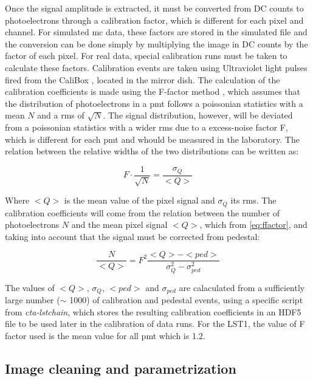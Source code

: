 \documentclass[main.tex]{subfiles}
\begin{document}
Once the signal amplitude is extracted, it must be converted from DC counts to photoelectrons through a calibration factor, which is different for each pixel and channel. For simulated \gls{mc} data, these factors are stored in the simulated file and the conversion can be done simply by multiplying the image in DC counts by the factor of each pixel. For real data, special calibration runs must be taken to calculate these factors. Calibration events are taken using Ultraviolet light pulses fired from the CaliBox \cite{2015CaliBox}, \cite{2019CaliBox} located in the mirror dish. The calculation of the calibration coefficients is made using the F-factor method \cite{1997calibrationPMT}, which assumes that the distribution of photoelectrons in a \gls{pmt} follows a poissonian statistics with a mean $N$ and a \gls{rms} of $\sqrt{N}$. The signal distribution, however, will be deviated from a poissonian statistics with a wider \gls{rms} due to a excess-noise factor F, which is different for each \gls{pmt} and whould be measured in the laboratory. The relation between the relative widths of the two distributions can be written as:

\begin{equation}
  F \cdot \frac{1}{\sqrt{N}} = \frac{\sigma_{Q}}{<Q>}
  \label{eq:ffactor}
\end{equation} 

Where $<Q>$ is the mean value of the pixel signal and $\sigma_{Q}$ its \gls{rms}. The calibration coefficients will come from the relation between the number of photoelectrons $N$ and the mean pixel signal $<Q>$, which from \ref{eq:ffactor}, and taking into account that the signal must be corrected from pedestal:

\begin{equation}
  \frac{N}{<Q>} = F^{2}\frac{<Q> - <ped>}{\sigma_{Q}^{2} - \sigma_{ped}^{2}}
\end{equation}

The values of $<Q>$, $\sigma_{Q}$, $<ped>$ and $\sigma_{ped}$ are calaculated from a sufficiently large number ($\sim$ 1000) of calibration and pedestal events, using a specific script from \textit{cta-lstchain}, which stores the resulting calibration coefficients in an HDF5 file to be used later in the calibration of data runs. For the LST1, the value of F factor used is the mean value for all \gls{pmt} which is 1.2.

\subsection{Image cleaning and parametrization} \label{sec:cleanpars}
\end{document}
